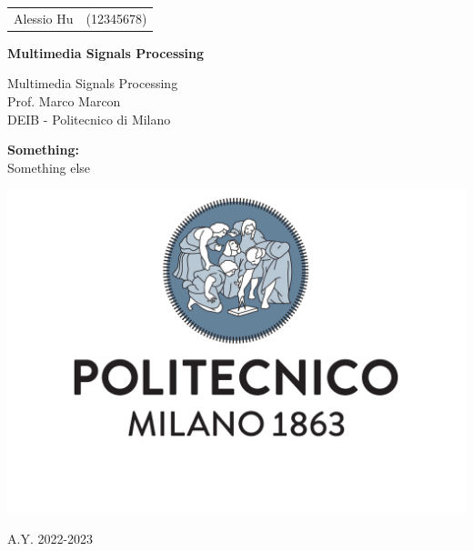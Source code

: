 \documentclass[a4paper, 11pt]{article}
\begin{document}
\begin{titlepage}
	\centering
    \begin{tabular}{rl}
        Alessio Hu & (12345678)
    \end{tabular}

    \vspace{1.5cm}
    {\Huge \textbf{Multimedia Signals Processing\\}}
    \vspace{1.5cm}
    {\large 
        Multimedia Signals Processing \\
        Prof. Marco Marcon \\ 
		DEIB - Politecnico di Milano \par
    }
    \vspace{1.5cm}
    {\large \textbf{Something:}\\
    \vspace{0.5cm}
    Something else}
    \par
    \vspace{3cm}
    \includegraphics[scale=0.4]{images/logo.pdf}
    \par
    \vspace{3cm}
	A.Y. 2022-2023
\end{titlepage}

\tableofcontents
    
    
    
    
    
    
    
    
\end{document}
